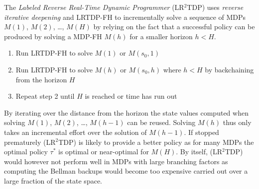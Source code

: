 \documentclass[runningheads,a4paper]{llncs}
\begin{document}
The \emph{Labeled Reverse Real-Time Dynamic Programmer} (LR$^2$TDP) uses \emph{reverse iterative deepening} and LRTDP-FH to incrementally solve a sequence of MDPs $M(1)$, $M(2)$, \ldots , $M(H)$ by relying on the fact that a successful policy can be produced by solving a MDP-FH $M(h)$ for a smaller horizon $h < H$. 

\begin{enumerate}
	\item Run LRTDP-FH to solve $M(1)$ or $M(s_0, 1)$
	\item Run LRTDP-FH to solve $M(h)$ or $M(s_0, h)$ where $h < H$ by backchaining from the horizon $H$
	\item Repeat step 2 until $H$ is reached or time has run out
\end{enumerate}
By iterating over the distance from the horizon the state values computed when solving $M(1)$, $M(2)$, \ldots, $M(h-1)$ can be reused. Solving $M(h)$ thus only takes an incremental effort over the solution of $M(h-1)$. If stopped prematurely  (LR$^2$TDP) is likely to provide a better policy as for many MDPs the optimal policy $\tau^*$ is optimal or near-optimal for $M(H)$. By itself,  (LR$^2$TDP) would however not perform well in MDPs with large branching factors as computing the Bellman backups would become too expensive carried out over a large fraction of the state space.
\end{document}
